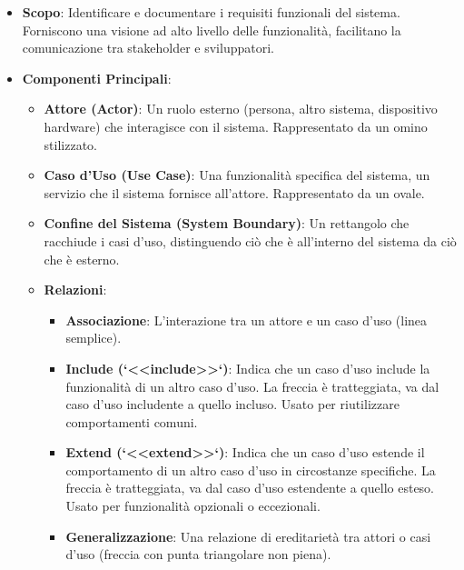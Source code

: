 \begin{itemize}
    \item \textbf{Scopo}: Identificare e documentare i requisiti funzionali del sistema. Forniscono una visione ad alto livello delle funzionalità, facilitano la comunicazione tra stakeholder e sviluppatori.
    \item \textbf{Componenti Principali}:
    \begin{itemize}
        \item \textbf{Attore (Actor)}: Un ruolo esterno (persona, altro sistema, dispositivo hardware) che interagisce con il sistema. Rappresentato da un omino stilizzato.
        \item \textbf{Caso d'Uso (Use Case)}: Una funzionalità specifica del sistema, un servizio che il sistema fornisce all'attore. Rappresentato da un ovale.
        \item \textbf{Confine del Sistema (System Boundary)}: Un rettangolo che racchiude i casi d'uso, distinguendo ciò che è all'interno del sistema da ciò che è esterno.
        \item \textbf{Relazioni}:
        \begin{itemize}
            \item \textbf{Associazione}: L'interazione tra un attore e un caso d'uso (linea semplice).
            \item \textbf{Include (`<<include>>`)}: Indica che un caso d'uso include la funzionalità di un altro caso d'uso. La freccia è tratteggiata, va dal caso d'uso includente a quello incluso. Usato per riutilizzare comportamenti comuni.
            \item \textbf{Extend (`<<extend>>`)}: Indica che un caso d'uso estende il comportamento di un altro caso d'uso in circostanze specifiche. La freccia è tratteggiata, va dal caso d'uso estendente a quello esteso. Usato per funzionalità opzionali o eccezionali.
            \item \textbf{Generalizzazione}: Una relazione di ereditarietà tra attori o casi d'uso (freccia con punta triangolare non piena).
        \end{itemize}
    \end{itemize}
\end{itemize}

